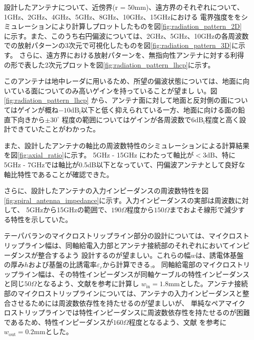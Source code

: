 \documentclass[11pt,a4paper,uplatex,draft]{ujarticle}
\begin{document}
  設計したアンテナについて、近傍界(r = 50mm)、遠方界のそれぞれについて、1GHz、2GHz、4GHz、5GHz、8GHz、10GHz、15GHzにおける
  電界強度ををシミュレーションにより計算しプロットしたものを図\ref{fig:radiation_pattern_2D}
  に示す。また、このうち右円偏波については、2GHz、5GHz、10GHzの各周波数での放射パターンの3次元で可視化したものを図\ref{fig:radiation_pattern_3D}に示す。
  さらに、遠方界における放射パターンを、無指向性アンテナに対する利得の形で表した2次元プロットを図\ref{fig:radiation_pattern_lhcp}に示す。

  このアンテナは地中レーダに用いるため、所望の偏波状態については、地面に向いている面についてのみ高いゲインを持っていることが望まし
  い。図\ref{fig:radiation_pattern_lhcp}
  から、アンテナ面に対して地面と反対側の面についてはゲインが概ね$-10\mathrm{dB_i}$以下と低く抑えられている一方、地面に向ける面の鉛直下向きから$\displaystyle \pm 30^{\circ}$
  程度の範囲についてはゲインが各周波数で$6\mathrm{dB_i}$程度と高く設計できていたことがわかった。

  また、設計したアンテナの軸比の周波数特性のシミュレーションによる計算結果を図\ref{fig:axial_ratio}に示す。
  5GHz - 15GHz にわたって軸比が$<3\mathrm{dB}$、特に5GHz - 7GHzでは軸比が0.5dB以下となっていて、円偏波アンテナとして良好な軸比特性であることが確認できた。

  さらに、設計したアンテナの入力インピーダンスの周波数特性を図\ref{fig:spiral_antenna_impedance}に示す。入力インピーダンスの実部は周波数に対して、
  5GHzから15GHzの範囲で、$190\Omega$程度から$150\Omega$までおよそ線形で減少する特性を示していた。

  テーパバランのマイクロストリップライン部分の設計については、マイクロストリップライン幅は、同軸給電入力部とアンテナ接続部のそれぞれにおいてインピーダンスが整合するよう
  設計するのが望ましい。これらの幅$w$は、誘電体基盤の厚み$h$および基盤の比誘電率$\varepsilon_r$から計算できる\cite{ground_microstrip_line},\cite{pair_microstrip_line}。
  同軸給電部のマイクロストリップライン幅は、その特性インピーダンスが同軸ケーブルの特性インピーダンスと同じ$50\Omega$となるよう、文献\cite{ground_microstrip_line}を参考に計算し
  $w_{\mathrm{in}} = 1.8\mathrm{mm}$とした。アンテナ接続部のマイクロストリップラインについては、アンテナの入力インピーダンスと整合させるためには周波数依存性を持たせるのが望ましいが、
  単純なペアマイクロストリップラインでは特性インピーダンスに周波数依存性を持たせるのが困難であるため、特性インピーダンスが$160\Omega$程度となるよう、文献\cite{pair_microstrip_line}
  を参考に$w_{\mathrm{out}} = 0.2\mathrm{mm}$とした。
\end{document}
